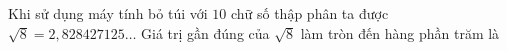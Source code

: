 \begin{ex}
Khi sử dụng máy tính bỏ túi với $10$ chữ số thập phân ta được $\sqrt8=2{,}828427125\ldots$ Giá trị gần đúng của $\sqrt8$ làm tròn đến hàng phần trăm là
\end{ex}
